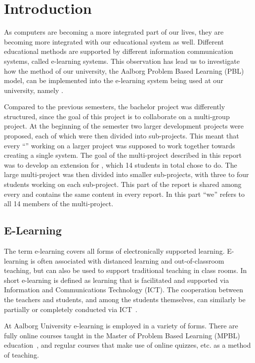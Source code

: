 \chapter{Introduction}
As computers are becoming a more integrated part of our lives, they are becoming more integrated with our educational system as well.
Different educational methods are supported by different information communication systems, called e-learning systems.
This observation has lead us to investigate how the method of our university, the Aalborg Problem Based Learning (PBL) model, can be implemented into the e-learning system being used at our university, namely \moodle{}.

Compared to the previous semesters, the bachelor project was differently structured, since the goal of this project is to collaborate on a multi-group project. At the beginning of the semester two larger development projects were proposed, each of which were then divided into sub-projects. This meant that every ``\subgroup{}'' working on a larger project was supposed to work together towards creating a single system. The goal of the multi-project described in this report was to develop an extension for \moodle{}, which 14 students in total chose to do. The large multi-project was then divided into smaller sub-projects, with three to four students working on each sub-project. 
This part of the report is shared among every \subgroup{} and contains the same content in every report.
In this part ``we'' refers to all 14 members of the multi-project.

\section{E-Learning}
\label{sec:e-learning}
The term e-learning covers all forms of electronically supported learning. 
E-learning is often associated with distanced learning and out-of-classroom teaching, but can also be used to support traditional teaching in class rooms. 
In short e-learning is defined as learning that is facilitated and supported via Information and Communications Technology (ICT). 
The cooperation between the teachers and students, and among the students themselves, can similarly be partially or completely conducted via ICT~\cite{def-e-learning1}\cite{def-e-learning2}.

At Aalborg University e-learning is employed in a variety of forms. 
There are fully online courses taught in the Master of Problem Based Learning (MPBL) education~\cite{mpbl}, and regular courses that make use of online quizzes, etc. as a method of teaching.


